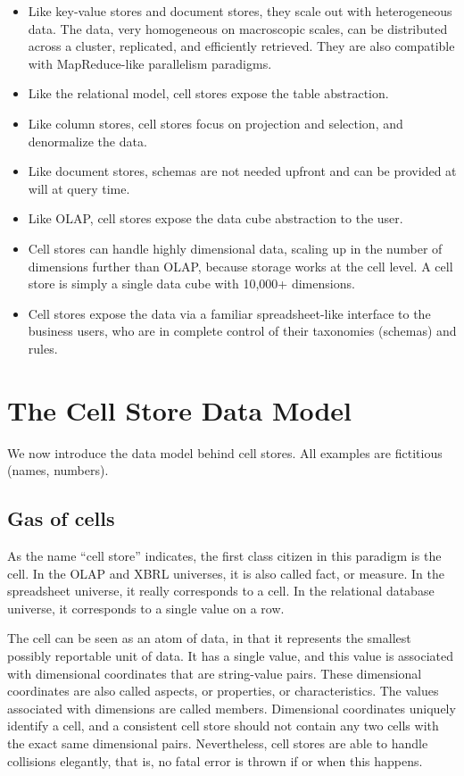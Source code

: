 \documentclass{acm_proc_article-sp}
\begin{document}
\begin{itemize}
\item Like key-value stores and document stores, they scale out with heterogeneous data. The data, very homogeneous on macroscopic scales, can be distributed across a cluster, replicated, and efficiently retrieved. They are also compatible with MapReduce-like parallelism paradigms.
\item Like the relational model, cell stores expose the table abstraction.
\item Like column stores, cell stores focus on projection and selection, and denormalize the data. 
\item Like document stores, schemas are not needed upfront and can be provided at will at query time.
\item Like OLAP, cell stores expose the data cube abstraction to the user.
\item Cell stores can handle highly dimensional data, scaling up in the number of dimensions further than OLAP, because storage works at the cell level. A cell store is simply a single data cube with 10,000+ dimensions.
\item Cell stores expose the data via a familiar spreadsheet-like interface to the business users, who are in complete control of their taxonomies (schemas) and rules.
\end{itemize}

\section{The Cell Store Data Model}
\label{section-data-model}

We now introduce the data model behind cell stores. All examples are fictitious (names, numbers).

\subsection{Gas of cells}

As the name ``cell store'' indicates, the first class citizen in this paradigm is the cell. In the OLAP and XBRL \cite{XBRL} universes, it is also called fact, or measure. In the spreadsheet universe, it really corresponds to a cell. In the relational database universe, it corresponds to a single value on a row.

The cell can be seen as an atom of data, in that it represents the smallest possibly reportable unit of data. It has a single value, and this value is associated with dimensional coordinates that are string-value pairs. These dimensional coordinates are also called aspects, or properties, or characteristics. The values associated with dimensions are called members. Dimensional coordinates uniquely identify a cell, and a consistent cell store should not contain any two cells with the exact same dimensional pairs. Nevertheless, cell stores are able to handle collisions elegantly, that is, no fatal error is thrown if or when this happens.
\end{document}
